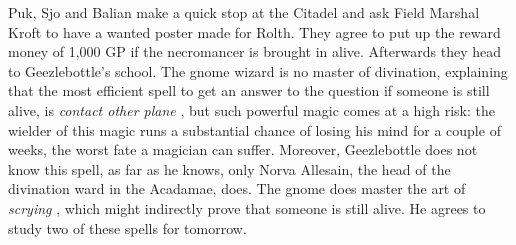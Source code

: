 Puk, Sjo and Balian make a quick stop at the Citadel and ask Field Marshal Kroft to have a wanted poster made for Rolth. They agree to put up the reward money of 1,000 GP if the necromancer is brought in alive. Afterwards they head to Geezlebottle's school. The gnome wizard is no master of divination, explaining that the most efficient spell to get an answer to the question if someone is still alive, is {\itshape contact other plane} , but such powerful magic comes at a high risk: the wielder of this magic runs a substantial chance of losing his mind for a couple of weeks, the worst fate a magician can suffer. Moreover, Geezlebottle does not know this spell, as far as he knows, only Norva Allesain, the head of the divination ward in the Acadamae, does. The gnome does master the art of  {\itshape scrying} , which might indirectly prove that someone is still alive. He agrees to study two of these spells for tomorrow. 